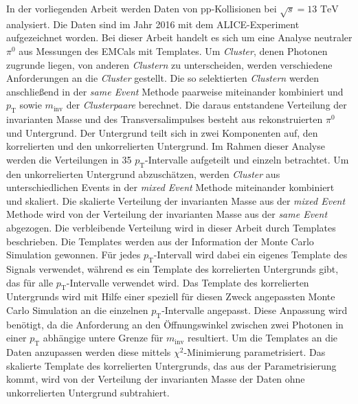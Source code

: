 In der vorliegenden Arbeit werden Daten von pp-Kollisionen bei $\sqrt{s}=13\text{ TeV}$ analysiert.
Die Daten sind im Jahr 2016 mit dem ALICE-Experiment aufgezeichnet worden.
Bei dieser Arbeit handelt es sich um eine Analyse neutraler $\pi^{0}$ aus Messungen des EMCals mit Templates. %
\newline
Um \textit{Cluster}, denen Photonen zugrunde liegen, von anderen \textit{Clustern} zu unterscheiden, werden verschiedene Anforderungen an die \textit{Cluster} gestellt.
Die so selektierten \textit{Clustern} werden anschließend in der \textit{same Event} Methode paarweise miteinander kombiniert und $p_\text{T}$ sowie $m_\text{inv}$ der \textit{Clusterpaare} berechnet.
\newline
Die daraus entstandene Verteilung der invarianten Masse und des Transversalimpulses besteht aus rekonstruierten $\pi^{0}$ und Untergrund.
Der Untergrund teilt sich in zwei Komponenten auf, den kor\-re\-lier\-ten und den unkorrelierten Untergrund.
Im Rahmen dieser Analyse werden die Verteilungen in 35 $p_\text{T}$-Intervalle aufgeteilt und einzeln betrachtet.
\newline
Um den unkorrelierten Untergrund abzuschätzen, werden \textit{Cluster} aus unterschiedlichen Events in der \textit{mixed Event} Methode miteinander kombiniert und skaliert.
Die skalierte Verteilung der invarianten Masse aus der \textit{mixed Event} Methode wird von der Verteilung der invarianten Masse aus der \textit{same Event} abgezogen.
\newline
Die verbleibende Verteilung wird in dieser Arbeit durch Templates beschrieben.
Die Templates werden aus der Information der Monte Carlo Simulation gewonnen.
Für jedes $p_\text{T}$-Intervall wird dabei ein eigenes Template des Signals verwendet, während es ein Template des korrelierten Untergrunds gibt, das für alle $p_\text{T}$-Intervalle verwendet wird.
Das Template des korrelierten Untergrunds wird mit Hilfe einer speziell für diesen Zweck angepassten Monte Carlo Simulation an die einzelnen $p_\text{T}$-Intervalle angepasst.
Diese Anpassung wird benötigt, da die Anforderung an den Öffnungswinkel zwischen zwei Photonen in einer $p_\text{T}$ abhängige untere Grenze für $m_\text{inv}$ resultiert.
\newline
Um die Templates an die Daten anzupassen werden diese mittels $\chi^{2}$-Minimierung parametrisiert.
Das skalierte Template des korrelierten Untergrunds, das aus der Parametrisierung kommt, wird von der Verteilung der invarianten Masse der Daten ohne unkorrelierten Untergrund subtrahiert.
